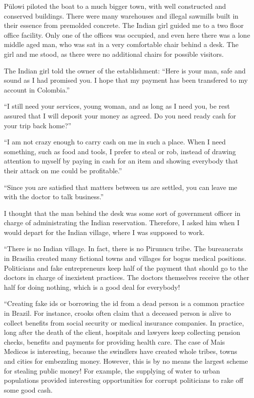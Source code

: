 \documentclass[
  12pt,
]{book}
\begin{document}
Pülowi piloted the boat to a much bigger town, with well constructed and
conserved buildings. There were many warehouses and illegal sawmills
built in their essence from premolded concrete. The Indian girl guided
me to a two floor office facility. Only one of the offices was occupied,
and even here there was a lone middle aged man, who was sat in a very
comfortable chair behind a desk. The girl and me stood, as there were no
additional chairs for possible visitors.

The Indian girl told the owner of the establishment: ``Here is your man,
safe and sound as I had promised you. I hope that my payment has been
transfered to my account in Colombia.''

``I still need your services, young woman, and as long as I need you, be
rest assured that I will deposit your money as agreed. Do you need ready
cash for your trip back home?''

``I am not crazy enough to carry cash on me in such a place. When I need
something, such as food and tools, I prefer to steal or rob, instead of
drawing attention to myself by paying in cash for an item and showing
everybody that their attack on me could be profitable.''

``Since you are satisfied that matters between us are settled, you can
leave me with the doctor to talk business.''

I thought that the man behind the desk was some sort of government
officer in charge of administrating the Indian reservation. Therefore, I
asked him when I would depart for the Indian village, where I was
supposed to work.

``There is no Indian village. In fact, there is no Pirunucu tribe. The
bureaucrats in Brasilia created many fictional towns and villages for
bogus medical positions. Politicians and fake entrepreneurs keep half of
the payment that should go to the doctors in charge of inexistent
practices. The doctors themselves receive the other half for doing
nothing, which is a good deal for everybody!

``Creating fake ids or borrowing the id from a dead person is a common
practice in Brazil. For instance, crooks often claim that a deceased
person is alive to collect benefits from social security or medical
insurance companies. In practice, long after the death of the client,
hospitals and lawyers keep collecting pension checks, benefits and
payments for providing health care. The case of Mais Medicos is
interesting, because the swindlers have created whole tribes, towns and
cities for embezzling money. However, this is by no means the largest
scheme for stealing public money! For example, the supplying of water to
urban populations provided interesting opportunities for corrupt
politicians to rake off some good cash.
\end{document}
